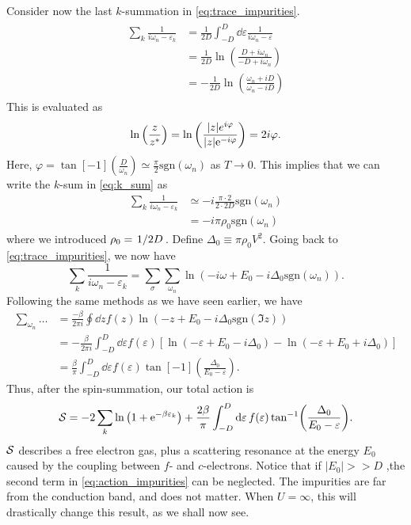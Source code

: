 Consider now the last $k$-summation in \eqref{eq:trace_impurities}.
\begin{align}
\label{eq:k_sum}
\begin{split}
	\sum_k\frac{1}{i\omega_n - \varepsilon_k} &= \frac{1}{2D}\int_{-D}^D\dd{\varepsilon}\frac{1}{i\omega_n - \varepsilon} \\
	&= \frac{1}{2D}\ln\left(\frac{D+i\omega_n}{-D + i\omega_n}\right)\\
	&=-\frac{1}{2D}\ln\left(\frac{\omega_n+iD}{\omega_n-iD}\right)
\end{split}
\end{align}
This is evaluated as
\begin{equation}
	\ln\left(\frac{z}{z^*}\right) = \ln\left(\frac{|z|e^{i\varphi}}{|z|\mathrm{e}^{-i\varphi}}\right) = 2i\varphi.
\end{equation}
Here, $\varphi = \tan[-1](\frac{D}{\omega_n}) \simeq \frac{\pi}{2}\mathrm{sgn}(\omega_n)$ as $T\rightarrow 0$.
This implies that we can write the $k$-sum in \eqref{eq:k_sum} as
\begin{align}
	\sum_k\frac{1}{i\omega_n - \varepsilon_k} &\simeq -i\frac{\pi\cdot 2}{2\cdot 2D}\mathrm{sgn}(\omega_n)\\
	&= -i\pi\rho_0\mathrm{sgn}(\omega_n)
\end{align}
where we introduced $\rho_0 = \flatfrac{1}{2D}$. Define $\Delta_0 \equiv \pi\rho_0 V^2$. Going back to \eqref{eq:trace_impurities}, we now have
\begin{equation}
	\sum_k\frac{1}{i\omega_n - \varepsilon_k} = \sum_\sigma\sum_{\omega_n}\ln\left(-i\omega + E_0 - i\Delta_0 \mathrm{sgn}(\omega_n)\right).
\end{equation}
Following the same methods as we have seen earlier, we have
\begin{align}
	\sum_{\omega_n}\dots &= \frac{-\beta}{2\pi i}\oint\dd{z}f(z)\ln(-z+E_0-i\Delta_0\mathrm{sgn}(\Im{z}))\nonumber\\
	&= -\frac{\beta}{2\pi i }\int_{-D}^{D}\dd{\varepsilon}f(\varepsilon)\left[\ln(-\varepsilon + E_0- i\Delta_0) - \ln(-\varepsilon + E_0 + i\Delta_0)\right] \nonumber\\
	\label{eq:action_derivation}
	&= \frac{\beta}{\pi}\int_{-D}^D\dd{\varepsilon}f(\varepsilon)\tan[-1](\frac{\Delta_0}{E_0 - \varepsilon}).
\end{align}
Thus, after the spin-summation, our total action is
\begin{equation}
\label{eq:action_impurities}
	\mathcal{S} = -2\sum_k\ln\left(1 + \mathrm{e}^{-\beta\varepsilon_k}\right) + \frac{2\beta}{\pi}\int_{-D}^D\dd{\varepsilon}f(\varepsilon)\tan[-1](\frac{\Delta_0}{E_0 - \varepsilon}).
\end{equation}
$\mathcal{S}$ describes a free electron gas, plus a scattering resonance at the energy $E_0$ caused by the coupling between  $f$- and $c$-electrons. Notice that if $|E_0| >> D$ ,the second term in \eqref{eq:action_impurities} can be neglected. The impurities are far from the conduction band, and does not matter. When $U = \infty$, this will drastically change this result, as we shall now see.

